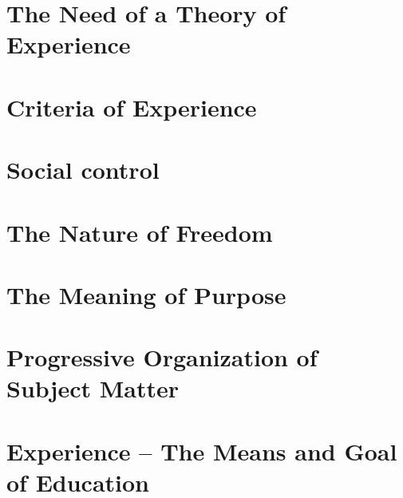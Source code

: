 \documentclass[fontsize=12pt,a5paper,BCOR=12mm,DIV=calc,twoside]{scrbook}
\begin{document}
\chapter{The Need of a Theory of Experience}


\chapter{Criteria of Experience}


\chapter{Social control}


\chapter{The Nature of Freedom}


\chapter{The Meaning of Purpose}


\chapter{Progressive Organization of Subject Matter}


\chapter{Experience -- The Means and Goal of Education }

\end{document}
